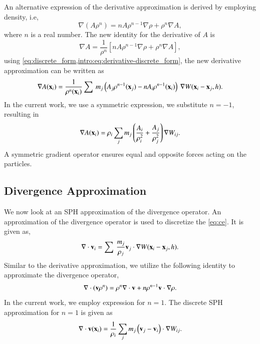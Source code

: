 An alternative expression of the derivative approximation is derived by employing
density, i.e,
\begin{equation}
  \label{intro:eq:sph-continu-derivative-final}
  \nabla (A \rho^n) = n A \rho^{n - 1} \nabla \rho + \rho^n \nabla A,
\end{equation}
where $n$ is a real number. The new identity for the derivative of $A$ is
\begin{equation}
  \nabla A = \frac{1}{\rho^n} \left[ n A \rho^{n - 1} \nabla \rho + \rho^n \nabla A  \right],
\end{equation}
using \cref{eq:discrete_form,intro:eq:derivative-discrete_form}, the new
derivative approximation can be written as
\begin{equation}
  \label{intro:eq:derivative-discrete_form}
  \nabla A(\mathbf{x}_i) = \frac{1}{\rho^n(\mathbf{x}_i)} \sum\>
  m_j \left(A_j \rho^{n-1}(\mathbf{x}_j) - n A_i \rho^{n-1}(\mathbf{x}_i) \right)\> \nabla W(\mathbf{x}_i - \mathbf{x}_j, h).
\end{equation}
In the current work, we use a symmetric expression, we substitute $n=-1$, resulting in
\begin{equation}
  \nabla A(\mathbf{x}_i) = \rho_i \sum_{j} m_j \left(\frac{A_i}{\rho_i^2} + \frac{A_j}{\rho_j^2}\right) \nabla W_{ij}.
\end{equation}
A symmetric gradient operator ensures equal and opposite forces acting on the
particles.


\subsection{Divergence Approximation}
We now look at an SPH approximation of the divergence operator. An approximation
of the divergence operator is used to discretize the \cref{eq:ce}. It is given
as,
\begin{equation}
  \label{intro:eq:discrete_derivative}
  \nabla \cdot \mathbf{v}_i = \sum\> \frac{m_j}{\rho_j} \mathbf{v}_j \cdot \nabla W(\mathbf{x}_i - \mathbf{x}_j, h).
\end{equation}
Similar to the derivative approximation, we utilize the following identity to approximate the divergence operator,
\begin{equation}
  \label{intro:eq:sph-continu-div-intermediate}
  \nabla \cdot (\mathbf{v} \rho^n) = \rho^n \nabla \cdot \mathbf{v} + n  \rho^{n - 1} \mathbf{v} \cdot \nabla \rho.
\end{equation}
In the current work, we employ expression for $n=1$. The discrete SPH approximation for $n=1$ is given as
\begin{equation}
  \label{intro:eq:sph-continu-div-final}
  \nabla \cdot \mathbf{v}(\mathbf{x}_i) = \frac{1}{\rho_i} \sum_{j} m_j \left(\mathbf{v}_j - \mathbf{v}_i\right) \cdot \nabla W_{ij}.
\end{equation}



